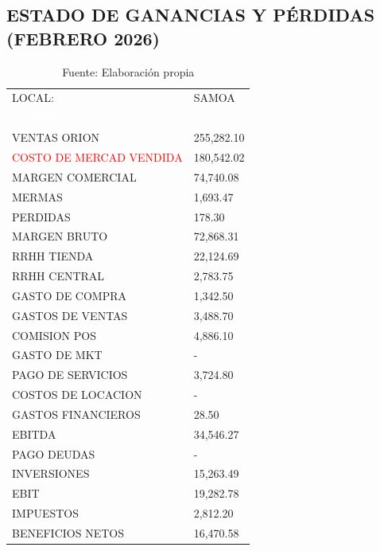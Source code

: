 \subsection*{ESTADO DE GANANCIAS Y PÉRDIDAS (FEBRERO 2026)}

\begin{table}[H]
\centering
\begin{tabular}{|L{8cm}|R{4cm}|}
\hline
{} LOCAL: &  SAMOA \\ 
\textcolor{white}{PERIODO:} & \textcolor{white}{Feb-24} \\ \hline
{} VENTAS ORION & 255,282.10 \\ 
\textcolor{red}{COSTO DE MERCAD VENDIDA} & 180,542.02 \\ 
 MARGEN COMERCIAL & 74,740.08 \\ 
MERMAS & 1,693.47 \\ 
PERDIDAS & 178.30 \\ 
 MARGEN BRUTO & 72,868.31 \\ 
RRHH TIENDA & 22,124.69 \\ 
RRHH CENTRAL & 2,783.75 \\ 
GASTO DE COMPRA & 1,342.50 \\ 
GASTOS DE VENTAS & 3,488.70 \\ 
COMISION POS & 4,886.10 \\ 
GASTO DE MKT & - \\ 
PAGO DE SERVICIOS & 3,724.80 \\ 
COSTOS DE LOCACION & - \\ 
GASTOS FINANCIEROS & 28.50 \\ 
 EBITDA & 34,546.27 \\ 
PAGO DEUDAS & - \\ 
INVERSIONES & 15,263.49 \\ 
 EBIT & 19,282.78 \\ 
IMPUESTOS & 2,812.20 \\ 
 BENEFICIOS NETOS & 16,470.58 \\ \hline
\end{tabular}
\caption{Fuente: Elaboración propia}
\end{table}

\vspace{1cm}

